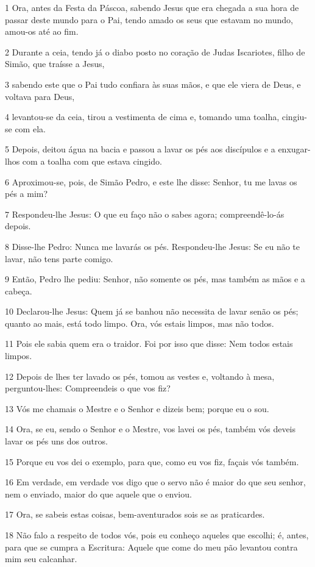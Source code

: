 \par 1 Ora, antes da Festa da Páscoa, sabendo Jesus que era chegada a sua hora de passar deste mundo para o Pai, tendo amado os seus que estavam no mundo, amou-os até ao fim.
\par 2 Durante a ceia, tendo já o diabo posto no coração de Judas Iscariotes, filho de Simão, que traísse a Jesus,
\par 3 sabendo este que o Pai tudo confiara às suas mãos, e que ele viera de Deus, e voltava para Deus,
\par 4 levantou-se da ceia, tirou a vestimenta de cima e, tomando uma toalha, cingiu-se com ela.
\par 5 Depois, deitou água na bacia e passou a lavar os pés aos discípulos e a enxugar-lhos com a toalha com que estava cingido.
\par 6 Aproximou-se, pois, de Simão Pedro, e este lhe disse: Senhor, tu me lavas os pés a mim?
\par 7 Respondeu-lhe Jesus: O que eu faço não o sabes agora; compreendê-lo-ás depois.
\par 8 Disse-lhe Pedro: Nunca me lavarás os pés. Respondeu-lhe Jesus: Se eu não te lavar, não tens parte comigo.
\par 9 Então, Pedro lhe pediu: Senhor, não somente os pés, mas também as mãos e a cabeça.
\par 10 Declarou-lhe Jesus: Quem já se banhou não necessita de lavar senão os pés; quanto ao mais, está todo limpo. Ora, vós estais limpos, mas não todos.
\par 11 Pois ele sabia quem era o traidor. Foi por isso que disse: Nem todos estais limpos.
\par 12 Depois de lhes ter lavado os pés, tomou as vestes e, voltando à mesa, perguntou-lhes: Compreendeis o que vos fiz?
\par 13 Vós me chamais o Mestre e o Senhor e dizeis bem; porque eu o sou.
\par 14 Ora, se eu, sendo o Senhor e o Mestre, vos lavei os pés, também vós deveis lavar os pés uns dos outros.
\par 15 Porque eu vos dei o exemplo, para que, como eu vos fiz, façais vós também.
\par 16 Em verdade, em verdade vos digo que o servo não é maior do que seu senhor, nem o enviado, maior do que aquele que o enviou.
\par 17 Ora, se sabeis estas coisas, bem-aventurados sois se as praticardes.
\par 18 Não falo a respeito de todos vós, pois eu conheço aqueles que escolhi; é, antes, para que se cumpra a Escritura: Aquele que come do meu pão levantou contra mim seu calcanhar.
